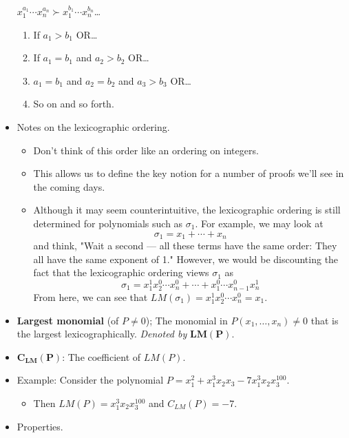 \documentclass[../notes.tex]{subfiles}
\begin{document}
\begin{itemize}
    $x_1^{a_1}\cdots x_n^{a_n}\succ x_1^{b_1}\cdots x_n^{b_n}$\dots
    \begin{enumerate}
        \item If $a_1>b_1$ OR\dots
        \item If $a_1=b_1$ and $a_2>b_2$ OR\dots
        \item $a_1=b_1$ and $a_2=b_2$ and $a_3>b_3$ OR\dots
        \item So on and so forth.
    \end{enumerate}
    \item Notes on the lexicographic ordering.
    \begin{itemize}
        \item Don't think of this order like an ordering on integers.
        \item This allows us to define the key notion for a number of proofs we'll see in the coming days.
        \item Although it may seem counterintuitive, the lexicographic ordering is still determined for polynomials such as $\sigma_1$. For example, we may look at
        \begin{equation*}
            \sigma_1 = x_1+\cdots+x_n
        \end{equation*}
        and think, "Wait a second --- all these terms have the same order: They all have the same exponent of 1." However, we would be discounting the fact that the lexicographic ordering views $\sigma_1$ as
        \begin{equation*}
            \sigma_1 = x_1^1x_2^0\cdots x_n^0+\cdots+x_1^0\cdots x_{n-1}^0x_n^1
        \end{equation*}
        From here, we can see that $LM(\sigma_1)=x_1^1x_2^0\cdots x_n^0=x_1$.
    \end{itemize}
    \item \textbf{Largest monomial} (of $P\neq 0$); The monomial in $P(x_1,\dots,x_n)\neq 0$ that is the largest lexicographically. \emph{Denoted by} $\bm{LM(P)}$.
    \item $\bm{C_{LM}(P)}$: The coefficient of $LM(P)$.
    \item Example: Consider the polynomial $P=x_1^2+x_1^3x_2x_3-7x_1^3x_2x_3^{100}$.
    \begin{itemize}
        \item Then $LM(P)=x_1^3x_2x_3^{100}$ and $C_{LM}(P)=-7$.
    \end{itemize}
    \item Properties.
    \begin{enumerate}

\end{enumerate}
\end{itemize}
\end{document}
